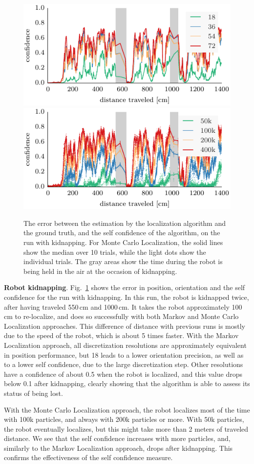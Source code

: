 \documentclass{svmult}
\newcommand{\Fig}[1]{Fig.~\ref{fig:#1}}
\begin{document}
\begin{figure}
\vspace{.2em}

\includegraphics[width=.5\columnwidth]{ml-whole_random_long-conf} \hfill \includegraphics[width=.5\columnwidth]{mcl-whole_random_long-conf}

\caption{The error between the estimation by the localization algorithm and the ground truth, and the self confidence of the algorithm, on the run with kidnapping.
For Monte Carlo Localization, the solid lines show the median over 10 trials, while the light dots show the individual trials.
The gray areas show the time during the robot is being held in the air at the occasion of kidnapping.}
\label{fig:whole-runs-random-long}
\end{figure}

\textbf{Robot kidnapping}.
\Fig{whole-runs-random-long} shows the error in position, orientation and the self confidence for the run with kidnapping.
In this run, the robot is kidnapped twice, after having traveled 550\,cm and 1000\,cm.
It takes the robot approximately 100\,cm to re-localize, and does so successfully with both Markov and Monte Carlo Localization approaches.
This difference of distance with previous runs is mostly due to the speed of the robot, which is about 5 times faster.
With the Markov Localization approach, all discretization resolutions are approximately equivalent in position performance, but 18 leads to a lower orientation precision, as well as to a lower self confidence, due to the large discretization step.
Other resolutions have a confidence of about 0.5 when the robot is localized, and this value drops below 0.1 after kidnapping, clearly showing that the algorithm is able to assess its status of being lost.

With the Monte Carlo Localization approach, the robot localizes most of the time with 100k particles, and always with 200k particles or more.
With 50k particles, the robot eventually localizes, but this might take more than 2 meters of traveled distance.
We see that the self confidence increases with more particles, and, similarly to the Markov Localization approach, drops after kidnapping.
This confirms the effectiveness of the self confidence measure.
\end{document}
